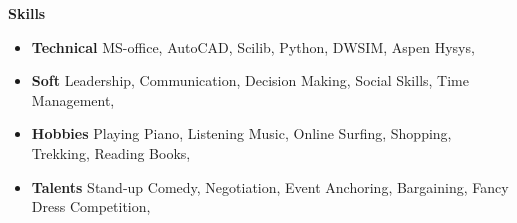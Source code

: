 \documentclass[letterpaper,12pt]{article}[leftmargin=*]
\def \entryspacing {-0pt}
\renewcommand{\section}[2]{\vspace{5pt}
  \colorbox{secondary}{\color{white}\raggedbottom\normalsize\textbf{{#1}{\hspace{7pt}#2}}}
}
\newcommand{\resumeEntryStart}{\begin{itemize}[leftmargin=2.5mm]}
\newcommand{\resumeEntryEnd}{\end{itemize}\vspace{\entryspacing}}
\newcommand{\resumeEntryS}[2]{
  \item[]\small{
    \textbf{\color{primary}#1 }{ #2 \vspace{-6pt}}
  }
}
\begin{document}
  
\section{\faGears}{Skills}
 \resumeEntryStart
 \resumeEntryS{Technical} { MS-office,
 AutoCAD,
 Scilib,
 Python,
 DWSIM,
 Aspen Hysys,}
  \vspace{4pt}
  \resumeEntryS{Soft}{ Leadership,
 Communication,
 Decision Making,
 Social Skills,
 Time Management,}
  \vspace{4pt}
  \resumeEntryS{Hobbies} { Playing Piano,
 Listening Music,
 Online Surfing,
 Shopping,
 Trekking,
 Reading Books,}
  \vspace{4pt}
  \resumeEntryS{Talents} { Stand-up Comedy,
 Negotiation,
 Event Anchoring,
 Bargaining,
 Fancy Dress Competition,}
 \resumeEntryEnd
\end{document}
